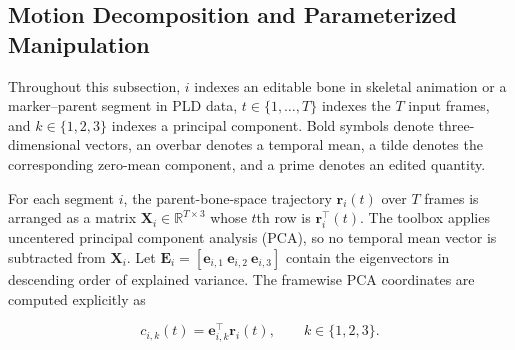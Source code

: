 \documentclass[12pt]{article}
\begin{document}





\subsection{Motion Decomposition and Parameterized Manipulation}
\label{sup:manipulation}

Throughout this subsection, $i$ indexes an editable bone in skeletal
animation or a marker--parent segment in PLD data, $t\in\{1,\ldots,T\}$
indexes the $T$ input frames, and $k\in\{1,2,3\}$ indexes a principal
component. Bold symbols denote three-dimensional vectors, an overbar
denotes a temporal mean, a tilde denotes the corresponding zero-mean
component, and a prime denotes an edited quantity.

For each segment $i$, the parent-bone-space trajectory
$\mathbf{r}_i(t)$ over $T$ frames is arranged as a matrix
$\mathbf{X}_i\in\mathbb{R}^{T\times3}$ whose $t$th row is
$\mathbf{r}_i^{\top}(t)$. The toolbox applies uncentered principal
component analysis (PCA), so no temporal mean vector is subtracted from
$\mathbf{X}_i$. Let
$\mathbf{E}_i=[\mathbf{e}_{i,1}\ \mathbf{e}_{i,2}\ \mathbf{e}_{i,3}]$
contain the eigenvectors in descending order of explained variance. The
framewise PCA coordinates are computed explicitly as

\begin{equation}
c_{i,k}(t)
=
\mathbf{e}_{i,k}^{\top}\mathbf{r}_i(t),
\qquad k\in\{1,2,3\}.
\label{eq:sup-pca-score}
\end{equation}
\end{document}
